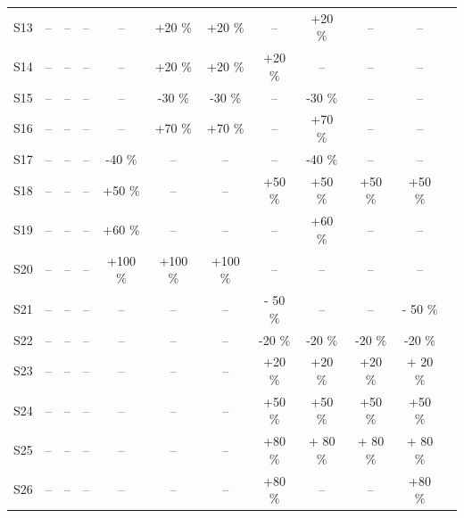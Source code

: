 \documentclass[11pt]{article}
\begin{document}
\begin{table}[htbp]
{\begin{tabular}{lccccccccccc}
S13 & --     & --     & --     & --     & +20 $\%$  & +20 $\%$  & --     & +20 $\%$  & --     & --    \\
S14 & --     & --     & --     & --     & +20 $\%$  & +20 $\%$  & +20 $\%$  & --     & --     & --    \\
S15 & --     & --     & --     & --     & -30 $\%$  & -30 $\%$  & --     & -30 $\%$  & --     & --    \\
S16 & --     & --     & --     & --     & +70 $\%$  & +70 $\%$  & --     & +70 $\%$  & --     & --    \\
S17 & --     & --     & --     & -40 $\%$  & --     & --     & --     & -40 $\%$  & --     & --    \\
S18 & --     & --     & --     & +50 $\%$  & --     & --     & +50 $\%$  & +50 $\%$  & +50 $\%$  & +50 $\%$ \\
S19 & --     & --     & --     & +60 $\%$  & --     & --     & --     & +60 $\%$  & --     & --    \\
S20 & --     & --     & --     & +100 $\%$ & +100 $\%$ & +100 $\%$ & --     & --     & --     & --    \\
S21 & --     & --     & --     & --     & --     & --     & - 50 $\%$  & --     & --     & - 50 $\%$ \\
S22 & --     & --     & --     & --     & --     & --     & -20 $\%$  & -20 $\%$  & -20 $\%$  & -20 $\%$ \\
S23 & --     & --     & --     & --     & --     & --     & +20 $\%$  & +20 $\%$  & +20 $\%$  & + 20 $\%$ \\
S24 & --     & --     & --     & --     & --     & --     & +50 $\%$  & +50 $\%$  & +50 $\%$  & +50 $\%$ \\
S25 & --     & --     & --     & --     & --     & --     & +80 $\%$  & + 80 $\%$  & + 80 $\%$  & + 80 $\%$ \\
S26 & --     & --     & --     & --     & --     & --     & +80 $\%$  & --     & --     & +80 $\%$ \\
\bottomrule
\end{tabular}
}
\end{table}
\end{document}

